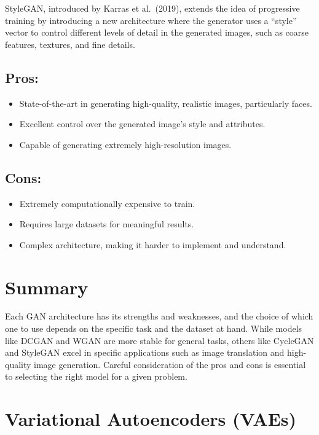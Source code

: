 \documentclass[
]{book}
\providecommand{\tightlist}{%
  \setlength{\itemsep}{0pt}\setlength{\parskip}{0pt}}
\begin{document}
StyleGAN, introduced by Karras et al.~(2019), extends the idea of progressive training by introducing a new architecture where the generator uses a ``style'' vector to control different levels of detail in the generated images, such as coarse features, textures, and fine details.

\subsection{Pros:}\label{pros-6}

\begin{itemize}
\tightlist
\item
  State-of-the-art in generating high-quality, realistic images, particularly faces.
\item
  Excellent control over the generated image's style and attributes.
\item
  Capable of generating extremely high-resolution images.
\end{itemize}

\subsection{Cons:}\label{cons-6}

\begin{itemize}
\tightlist
\item
  Extremely computationally expensive to train.
\item
  Requires large datasets for meaningful results.
\item
  Complex architecture, making it harder to implement and understand.
\end{itemize}

\section{Summary}\label{summary}

Each GAN architecture has its strengths and weaknesses, and the choice of which one to use depends on the specific task and the dataset at hand. While models like DCGAN and WGAN are more stable for general tasks, others like CycleGAN and StyleGAN excel in specific applications such as image translation and high-quality image generation. Careful consideration of the pros and cons is essential to selecting the right model for a given problem.

\section{Variational Autoencoders (VAEs)}\label{variational-autoencoders-vaes}
\end{document}
